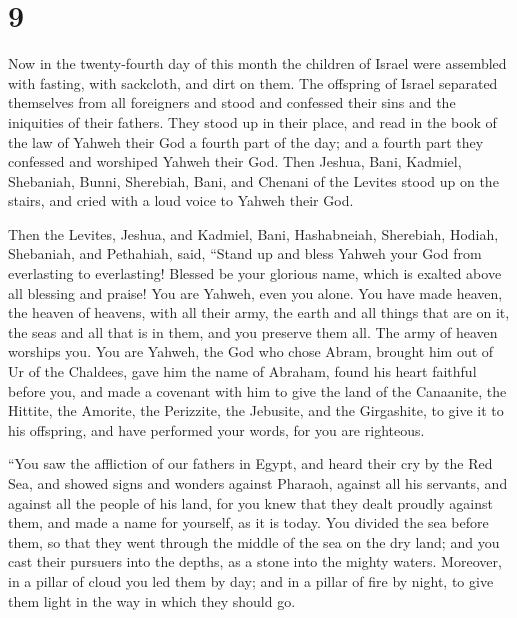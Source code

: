 \hypertarget{section-8}{%
\section{9}\label{section-8}}

 Now in the twenty-fourth day of this month the children
of Israel were assembled with fasting, with sackcloth, and dirt on them.
 The offspring of Israel separated themselves from all
foreigners and stood and confessed their sins and the iniquities of
their fathers.  They stood up in their place, and read in
the book of the law of Yahweh their God a fourth part of the day; and a
fourth part they confessed and worshiped Yahweh their God.
 Then Jeshua, Bani, Kadmiel, Shebaniah, Bunni, Sherebiah,
Bani, and Chenani of the Levites stood up on the stairs, and cried with
a loud voice to Yahweh their God.

 Then the Levites, Jeshua, and Kadmiel, Bani, Hashabneiah,
Sherebiah, Hodiah, Shebaniah, and Pethahiah, said, ``Stand up and bless
Yahweh your God from everlasting to everlasting! Blessed be your
glorious name, which is exalted above all blessing and praise!
 You are Yahweh, even you alone. You have made heaven, the
heaven of heavens, with all their army, the earth and all things that
are on it, the seas and all that is in them, and you preserve them all.
The army of heaven worships you.  You are Yahweh, the God
who chose Abram, brought him out of Ur of the Chaldees, gave him the
name of Abraham,  found his heart faithful before you, and
made a covenant with him to give the land of the Canaanite, the Hittite,
the Amorite, the Perizzite, the Jebusite, and the Girgashite, to give it
to his offspring, and have performed your words, for you are righteous.

 ``You saw the affliction of our fathers in Egypt, and
heard their cry by the Red Sea,  and showed signs and
wonders against Pharaoh, against all his servants, and against all the
people of his land, for you knew that they dealt proudly against them,
and made a name for yourself, as it is today.  You
divided the sea before them, so that they went through the middle of the
sea on the dry land; and you cast their pursuers into the depths, as a
stone into the mighty waters.  Moreover, in a pillar of
cloud you led them by day; and in a pillar of fire by night, to give
them light in the way in which they should go.

